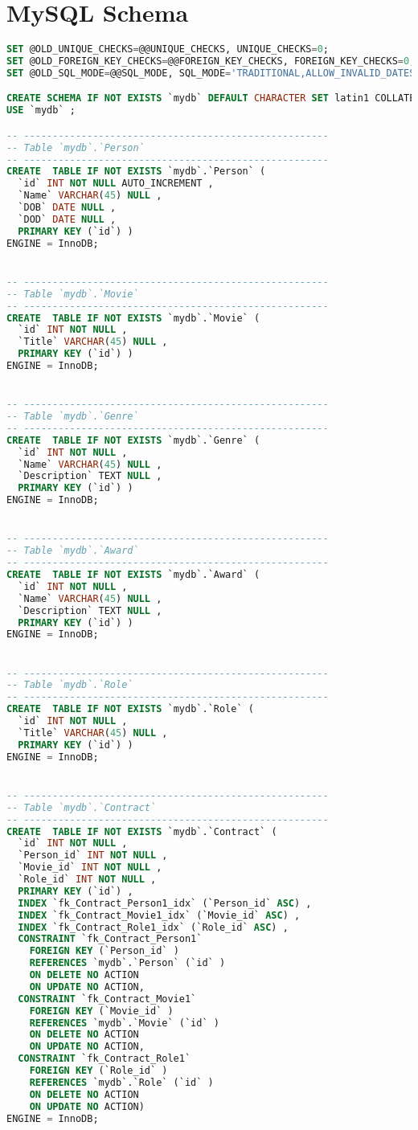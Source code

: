 \section{MySQL Schema}
\begin{lstlisting}[language=sql]
SET @OLD_UNIQUE_CHECKS=@@UNIQUE_CHECKS, UNIQUE_CHECKS=0;
SET @OLD_FOREIGN_KEY_CHECKS=@@FOREIGN_KEY_CHECKS, FOREIGN_KEY_CHECKS=0;
SET @OLD_SQL_MODE=@@SQL_MODE, SQL_MODE='TRADITIONAL,ALLOW_INVALID_DATES';

CREATE SCHEMA IF NOT EXISTS `mydb` DEFAULT CHARACTER SET latin1 COLLATE latin1_swedish_ci ;
USE `mydb` ;

-- -----------------------------------------------------
-- Table `mydb`.`Person`
-- -----------------------------------------------------
CREATE  TABLE IF NOT EXISTS `mydb`.`Person` (
  `id` INT NOT NULL AUTO_INCREMENT ,
  `Name` VARCHAR(45) NULL ,
  `DOB` DATE NULL ,
  `DOD` DATE NULL ,
  PRIMARY KEY (`id`) )
ENGINE = InnoDB;


-- -----------------------------------------------------
-- Table `mydb`.`Movie`
-- -----------------------------------------------------
CREATE  TABLE IF NOT EXISTS `mydb`.`Movie` (
  `id` INT NOT NULL ,
  `Title` VARCHAR(45) NULL ,
  PRIMARY KEY (`id`) )
ENGINE = InnoDB;


-- -----------------------------------------------------
-- Table `mydb`.`Genre`
-- -----------------------------------------------------
CREATE  TABLE IF NOT EXISTS `mydb`.`Genre` (
  `id` INT NOT NULL ,
  `Name` VARCHAR(45) NULL ,
  `Description` TEXT NULL ,
  PRIMARY KEY (`id`) )
ENGINE = InnoDB;


-- -----------------------------------------------------
-- Table `mydb`.`Award`
-- -----------------------------------------------------
CREATE  TABLE IF NOT EXISTS `mydb`.`Award` (
  `id` INT NOT NULL ,
  `Name` VARCHAR(45) NULL ,
  `Description` TEXT NULL ,
  PRIMARY KEY (`id`) )
ENGINE = InnoDB;


-- -----------------------------------------------------
-- Table `mydb`.`Role`
-- -----------------------------------------------------
CREATE  TABLE IF NOT EXISTS `mydb`.`Role` (
  `id` INT NOT NULL ,
  `Title` VARCHAR(45) NULL ,
  PRIMARY KEY (`id`) )
ENGINE = InnoDB;


-- -----------------------------------------------------
-- Table `mydb`.`Contract`
-- -----------------------------------------------------
CREATE  TABLE IF NOT EXISTS `mydb`.`Contract` (
  `id` INT NOT NULL ,
  `Person_id` INT NOT NULL ,
  `Movie_id` INT NOT NULL ,
  `Role_id` INT NOT NULL ,
  PRIMARY KEY (`id`) ,
  INDEX `fk_Contract_Person1_idx` (`Person_id` ASC) ,
  INDEX `fk_Contract_Movie1_idx` (`Movie_id` ASC) ,
  INDEX `fk_Contract_Role1_idx` (`Role_id` ASC) ,
  CONSTRAINT `fk_Contract_Person1`
    FOREIGN KEY (`Person_id` )
    REFERENCES `mydb`.`Person` (`id` )
    ON DELETE NO ACTION
    ON UPDATE NO ACTION,
  CONSTRAINT `fk_Contract_Movie1`
    FOREIGN KEY (`Movie_id` )
    REFERENCES `mydb`.`Movie` (`id` )
    ON DELETE NO ACTION
    ON UPDATE NO ACTION,
  CONSTRAINT `fk_Contract_Role1`
    FOREIGN KEY (`Role_id` )
    REFERENCES `mydb`.`Role` (`id` )
    ON DELETE NO ACTION
    ON UPDATE NO ACTION)
ENGINE = InnoDB;



\end{lstlisting}
